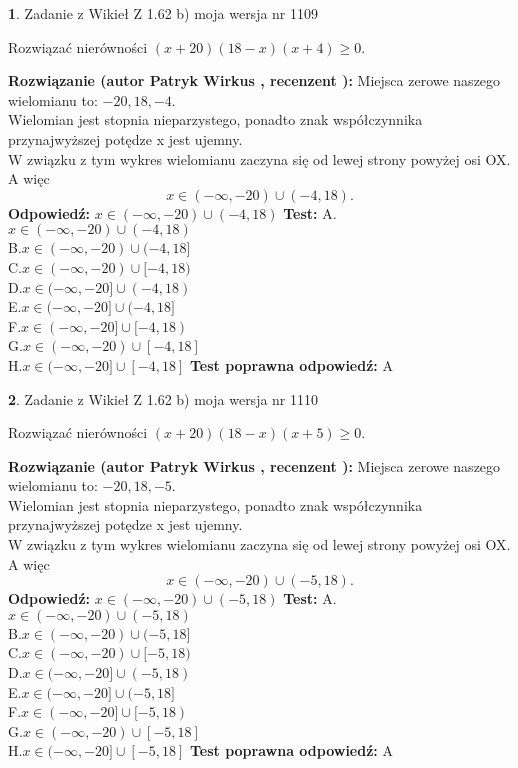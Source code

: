 \documentclass[12pt, a4paper]{article}
\theoremstyle{definition} %
\newtheorem{zad}{}
\newcommand{\zadStart}[1]{\begin{zad}#1\newline}
\newcommand{\zadStop}{\end{zad}}
\newcommand{\rozwStart}[2]{\noindent \textbf{Rozwiązanie (autor #1 , recenzent #2): }\newline}
\newcommand{\rozwStop}{\newline}
\newcommand{\odpStart}{\noindent \textbf{Odpowiedź:}\newline}
\newcommand{\odpStop}{\newline}
\newcommand{\testStart}{\noindent \textbf{Test:}\newline}
\newcommand{\testStop}{\newline}
\newcommand{\kluczStart}{\noindent \textbf{Test poprawna odpowiedź:}\newline}
\newcommand{\kluczStop}{\newline}
\begin{document}
\zadStart{Zadanie z Wikieł Z 1.62 b) moja wersja nr 1109}

Rozwiązać nierówności $(x+20)(18-x)(x+4)\ge0$.
\zadStop
\rozwStart{Patryk Wirkus}{}
Miejsca zerowe naszego wielomianu to: $-20, 18, -4$.\\
Wielomian jest stopnia nieparzystego, ponadto znak współczynnika przy\linebreak najwyższej potędze x jest ujemny.\\ W związku z tym wykres wielomianu zaczyna się od lewej strony powyżej osi OX. A więc $$x \in (-\infty,-20) \cup (-4,18).$$
\rozwStop
\odpStart
$x \in (-\infty,-20) \cup (-4,18)$
\odpStop
\testStart
A.$x \in (-\infty,-20) \cup (-4,18)$\\
B.$x \in (-\infty,-20) \cup (-4,18]$\\
C.$x \in (-\infty,-20) \cup [-4,18)$\\
D.$x \in (-\infty,-20] \cup (-4,18)$\\
E.$x \in (-\infty,-20] \cup (-4,18]$\\
F.$x \in (-\infty,-20] \cup [-4,18)$\\
G.$x \in (-\infty,-20) \cup [-4,18]$\\
H.$x \in (-\infty,-20] \cup [-4,18]$
\testStop
\kluczStart
A
\kluczStop



\zadStart{Zadanie z Wikieł Z 1.62 b) moja wersja nr 1110}

Rozwiązać nierówności $(x+20)(18-x)(x+5)\ge0$.
\zadStop
\rozwStart{Patryk Wirkus}{}
Miejsca zerowe naszego wielomianu to: $-20, 18, -5$.\\
Wielomian jest stopnia nieparzystego, ponadto znak współczynnika przy\linebreak najwyższej potędze x jest ujemny.\\ W związku z tym wykres wielomianu zaczyna się od lewej strony powyżej osi OX. A więc $$x \in (-\infty,-20) \cup (-5,18).$$
\rozwStop
\odpStart
$x \in (-\infty,-20) \cup (-5,18)$
\odpStop
\testStart
A.$x \in (-\infty,-20) \cup (-5,18)$\\
B.$x \in (-\infty,-20) \cup (-5,18]$\\
C.$x \in (-\infty,-20) \cup [-5,18)$\\
D.$x \in (-\infty,-20] \cup (-5,18)$\\
E.$x \in (-\infty,-20] \cup (-5,18]$\\
F.$x \in (-\infty,-20] \cup [-5,18)$\\
G.$x \in (-\infty,-20) \cup [-5,18]$\\
H.$x \in (-\infty,-20] \cup [-5,18]$
\testStop
\kluczStart
A
\kluczStop
\end{document}

